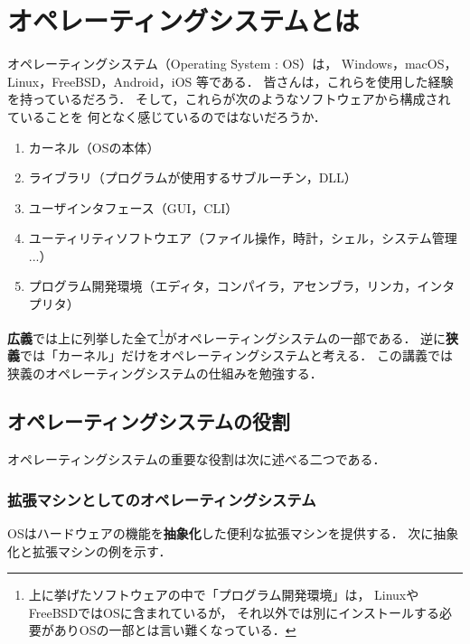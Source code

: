 \chapter{オペレーティングシステムとは}

オペレーティングシステム（Operating System : OS）は，
Windows，macOS，Linux，FreeBSD，Android，iOS
等である．
皆さんは，これらを使用した経験を持っているだろう．
そして，これらが次のようなソフトウェアから構成されていることを
何となく感じているのではないだろうか．

\begin{enumerate}
\item カーネル（OSの本体）
\item ライブラリ（プログラムが使用するサブルーチン，DLL）
\item ユーザインタフェース（GUI，CLI）
\item ユーティリティソフトウエア（ファイル操作，時計，シェル，システム管理 ...）
\item プログラム開発環境（エディタ，コンパイラ，アセンブラ，リンカ，インタプリタ）
\end{enumerate}

{\bf 広義}では上に列挙した全て\footnote{
上に挙げたソフトウェアの中で「プログラム開発環境」は，
LinuxやFreeBSDではOSに含まれているが，
それ以外では別にインストールする必要がありOSの一部とは言い難くなっている．
}がオペレーティングシステムの一部である．
逆に{\bf 狭義}では「カーネル」だけをオペレーティングシステムと考える．
この講義では狭義のオペレーティングシステムの仕組みを勉強する．

\section{オペレーティングシステムの役割}
\label{osRole}

オペレーティングシステムの重要な役割は次に述べる二つである．

\subsection{拡張マシンとしてのオペレーティングシステム}
\label{abstruction}

OSはハードウェアの機能を{\bf 抽象化}した便利な拡張マシンを提供する．
次に抽象化と拡張マシンの例を示す．


